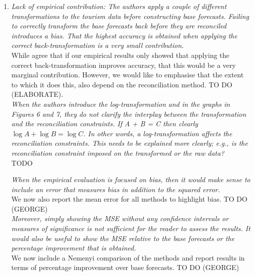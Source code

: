 \documentclass[a4paper,11pt]{article}
\begin{document}
	
	\begin{enumerate}
		
		
		
		\item \textit{Lack of empirical contribution: The authors apply a couple of different transformations to the tourism data before constructing base forecasts. Failing to correctly transform the base forecasts back before they are reconciled introduces a bias. That the highest accuracy is obtained when applying the correct back-transformation is a very small contribution.}\\
		
		While agree that if our empirical results only showed that applying the correct back-transformation improves accuracy, that this would be a very marginal contribution.  However, we would like to emphasise that the extent to which it does this, also depend on the reconciliation method. TO DO (ELABORATE).\\
		
        \textit{When the authors introduce the log-transformation and in the graphs in Figures 6 and 7, they do not clarify the interplay between the transformation and the reconciliation constraints. If A + B = C then clearly $\log A + \log B = \log C$. In other words, a log-transformation affects the	reconciliation constraints. This needs to be explained more clearly; e.g., is the reconciliation constraint imposed on the transformed or the raw data?}\\
		
		TODO
		
		\textit{When the empirical evaluation is focused on bias, then it would make sense to include an error that measures bias in addition to the squared error.}\\
		
		We now also report the mean error for all methods to highlight bias. TO DO (GEORGE)\\
		
		\textit{Moreover, simply showing the MSE without any confidence intervals or measures of significance is not sufficient for the reader to assess the results.  It would also be useful to show the MSE relative to the base forecasts or the percentage improvement that is obtained.} \\
		
		We now include a Nemenyi comparison of the methods and report results in terms of percentage improvement over base forecasts. TO DO (GEORGE)\\
	

\end{enumerate}
\end{document}
